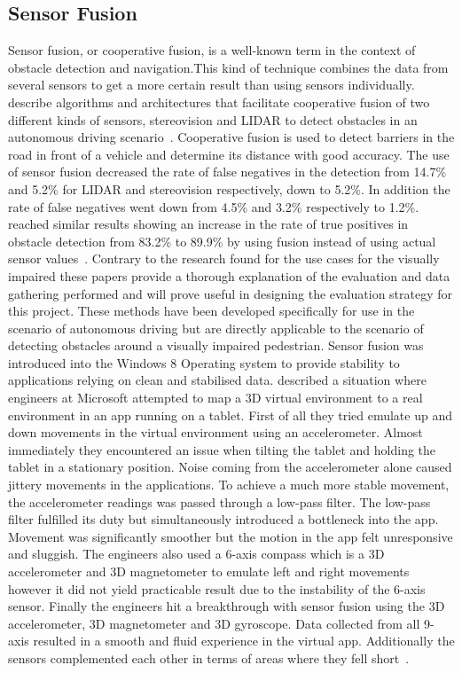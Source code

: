 \documentclass[prodmode,acmtosem]{acmsmall} %
\begin{document}
\subsection{Sensor Fusion}
Sensor fusion, or cooperative fusion, is a well-known term in the context of obstacle detection and navigation.This kind of technique combines the data from several sensors to get a more certain result than using sensors individually. \citet{Labayrade2005} describe algorithms and architectures that facilitate cooperative fusion of two different kinds of sensors, stereovision and LIDAR to detect obstacles in an autonomous driving scenario~\cite{Labayrade2005}. Cooperative fusion is used to detect barriers in the road in front of a vehicle and determine its distance with good accuracy. The use of sensor fusion decreased the rate of false negatives in the detection from 14.7\% and 5.2\% for LIDAR and stereovision respectively, down to 5.2\%. In addition the rate of false negatives went down from 4.5\% and 3.2\% respectively to 1.2\%. \citet{Cho2014} reached similar results showing an increase in the rate of true positives in obstacle detection from 83.2\% to 89.9\% by using fusion instead of using actual sensor values~\cite{Cho2014}. Contrary to the research found for the use cases for the visually impaired these papers provide a thorough explanation of the evaluation and data gathering performed and will prove useful in designing the evaluation strategy for this project. These methods have been developed specifically for use in the scenario of autonomous driving but are directly applicable to the scenario of detecting obstacles around a visually impaired pedestrian. Sensor fusion was introduced into the Windows 8 Operating system to provide stability to applications relying on clean and stabilised data. \citet{Gear2012} described a situation where engineers at Microsoft attempted to map a 3D virtual environment to a real environment in an app running on a tablet. First of all they tried emulate up and down movements in the virtual environment using an accelerometer. Almost immediately they encountered an issue when tilting the tablet and holding the tablet in a stationary position. Noise coming from the accelerometer alone caused jittery movements in the applications. To achieve a much more stable movement, the accelerometer readings was passed through a low-pass filter. The low-pass filter fulfilled its duty but simultaneously introduced a bottleneck into the app. Movement was significantly smoother but the motion in the app felt unresponsive and sluggish. The engineers also used a 6-axis compass which is a 3D accelerometer and 3D magnetometer to emulate left and right movements however it did not yield practicable result due to the instability of the 6-axis sensor. Finally the engineers hit a breakthrough with sensor fusion using the 3D accelerometer, 3D magnetometer and 3D gyroscope. Data collected from all 9-axis resulted in a smooth and fluid experience in the virtual app. Additionally the sensors complemented each other in terms of areas where they fell short~\cite{Gear2012}.
\end{document}
